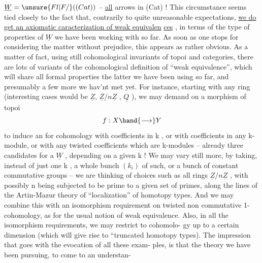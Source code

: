 
$\underline{W} = \unsure{Fl|F/}((Cat))$ -- \uline{all} arrows in (Cat) ! This circumstance seems tied
closely to the fact that, contrarily to quite unreasonable expectations,
\uline{we  do  get an axiomatic caracterization of weak equivalen}%
\uline{ces} , in terms of the type of  properties of $\underline{W}$ we have
been working with so far. As soon as one stops for considering the matter
without prejudice, this appears as rather obvious. As a matter of fact,
using still cohomological invariants of topoi and categories, there are
lots of variants of the cohomological definition of ``weak equivalence'',
which will share all formal properties  the latter we have been using
so far, and presumably a few more we hav'nt met yet. For instance,
starting with any  ring  (interesting cases would be $\underline{Z}$,
$\underline{Z}/n\underline{Z}$ , $\underline{Q}$ ), we may demand on a morphism of topoi
\[ f: X \hand{\longrightarrow} Y \]
to induce an  for cohomology with coefficients in k , or
with coefficients in any k-module, or with any twisted coefficients which
are k-modules -- already three candidates for a $\underline{W}$ , depending on a
given k ! We may vary still more, by taking, instead of just one
k , a whole bunch $(k_{i})$ of such, or a bunch of \hand{(}constant \unsure{\hand{)}} commutative
groups -- we  are thinking of choices such as all rings $\underline{Z}/n\underline{Z}$ , with
possibly n being subjected to be prime to a given set of primes, along
the lines of the Artin-Mazur theory of ``localization'' of homotopy types.
And we may combine this with an isomorphism requirement on twisted non
commutative 1-cohomology, as for the usual notion of weak equivalence.
Also, in all the isomorphism requirements, we may restrict to cohomolo-%
gy up to a certain dimension (which will give rise to ``truncated homotopy
types). The impression that goes with the evocation of all these exam-%
ples, is that the theory we have been pursuing, to come to an understan-%
